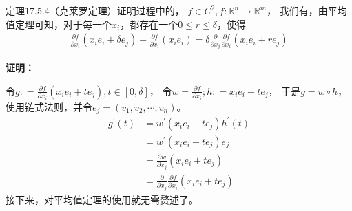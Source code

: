 \documentclass{article}
\begin{document}
\begin{zremark}
  定理17.5.4（克莱罗定理）证明过程中的，
  $f \in C^2, f: \mathbb{R}^n \to \mathbb{R}^m$，
  我们有，由平均值定理可知，对于每一个$x_i$，都存在一个$0 \leq r \leq \delta$，使得
  \begin{align*}
    \frac{\partial f}{\partial x_i}(x_i e_i + \delta e_j) - \frac{\partial f}{\partial x_i}(x_i e_i)
    = \delta \frac{\partial}{\partial x_j} \frac{\partial f}{\partial x_i} (x_ie_i + r e_j)
  \end{align*}
\end{zremark}

\textbf{证明：}

令$g : = \frac{\partial f}{\partial x_i}(x_i e_i + t e_j), t \in [0, \delta]$，
令$w = \frac{\partial f}{\partial x_i}; h : = x_i e_i + te_j$，
于是$g = w \circ h$，
使用链式法则，并令$e_j = (v_1, v_2, \cdots, v_n)$。
\begin{align*}
  g^\prime(t) & = w^\prime (x_ie_i + t e_j) h^\prime(t)                                          \\
              & = w^\prime (x_ie_i + t e_j) e_j                                                  \\
              & = \frac{\partial w}{\partial x_j}(x_ie_i + t e_j)                                \\
              & = \frac{\partial}{\partial x_j} \frac{\partial f}{\partial x_i} (x_ie_i + t e_j)
\end{align*}
接下来，对平均值定理的使用就无需赘述了。
\end{document}
